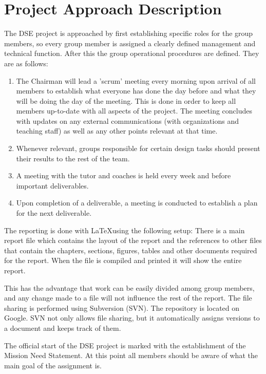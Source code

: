\section{Project Approach Description}
\label{dseProjectApproachDescription}
The DSE project is approached by first establishing specific roles for the group members, so every group member is assigned a clearly defined management and technical function. After this the group operational procedures are defined. They are as follows:

\begin{enumerate}
	\item The Chairman will lead a 'scrum' meeting every morning upon arrival of all members to establish what everyone has done the day before and what they will be doing the day of the meeting. This is done in order to keep all members up-to-date with all aspects of the project. The meeting concludes with updates on any external communications (with organizations and teaching staff) as well as any other points relevant at that time.
	\item Whenever relevant, groups responsible for certain design tasks should present their results to the rest of the team.
	\item A meeting with the tutor and coaches is held every week and before important deliverables.
	\item Upon completion of a deliverable, a meeting is conducted to establish a plan for the next deliverable.  
\end{enumerate}

The reporting is done with \LaTeX using the following setup: There is a main report file which contains the layout of the report and the references to other files that contain the chapters, sections, figures, tables and other documents required for the report. When the file is compiled and printed it will show the entire report.

This has the advantage that work can be easily divided among group members, and any change made to a file will not influence the rest of the report. The file sharing is performed using Subversion (SVN). The repository is located on Google\texttrademark. SVN not only allows file sharing, but it automatically assigns versions to a document and keeps track of them.

The official start of the DSE project is marked with the establishment of the Mission Need Statement. At this point all members should be aware of what the main goal of the assignment is.

